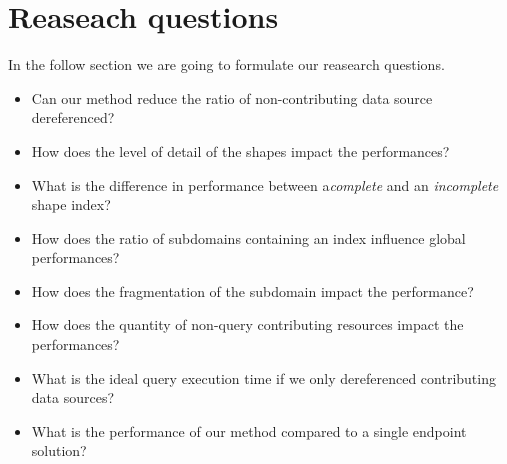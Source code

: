 \section{Reaseach questions}
In the follow section we are going to formulate our reasearch questions.

\begin{itemize}
    \item Can our method reduce the ratio of non-contributing data source dereferenced?
    
    \item How does the level of detail of the shapes impact the performances?
    \item What is the difference in performance between a\emph{complete} and an \emph{incomplete} shape index?
    \item How does the ratio of subdomains containing an index influence global performances?
    \item How does the fragmentation of the subdomain impact the performance?
    
    \item How does the quantity of non-query contributing resources impact the performances?

    \item What is the ideal query execution time if we only dereferenced contributing data sources?
    \item What is the performance of our method compared to a single endpoint solution?
\end{itemize}
